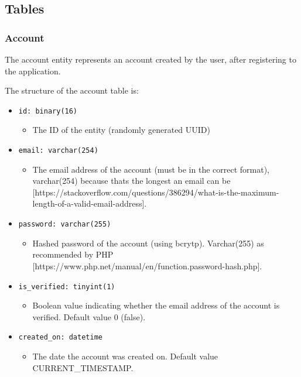 \documentclass[12pt,openany,a4paper]{book}
\begin{document}
\subsection{Tables}
\label{secn:tables}

\subsubsection{Account}

The account entity represents an account created by the user, after registering
to the application.

The structure of the account table is:

\begin{itemize}
	\item \verb|id: binary(16)|
	\begin{itemize}
		\item The ID of the entity (randomly generated UUID)
	\end{itemize}
	\item \verb|email: varchar(254)|
	\begin{itemize}
		\item The email address of the account (must be in the correct format),
		varchar(254) because thats the longest an email can be [https://stackoverflow.com/questions/386294/what-is-the-maximum-length-of-a-valid-email-address].
	\end{itemize}
	\item \verb|password: varchar(255)|
	\begin{itemize}
		\item Hashed password of the account (using bcrytp). Varchar(255) as
		recommended by PHP [https://www.php.net/manual/en/function.password-hash.php].
	\end{itemize}
	\item \verb|is_verified: tinyint(1)|
	\begin{itemize}
		\item Boolean value indicating whether the email address of the account
		is verified. Default value 0 (false).
	\end{itemize}
	\item \verb|created_on: datetime|
	\begin{itemize}
		\item The date the account was created on. Default value
		CURRENT\_TIMESTAMP.
	\end{itemize}
\end{itemize}
\end{document}
